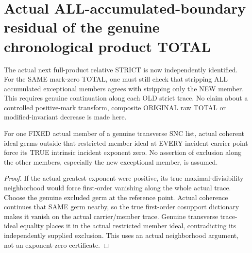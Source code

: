 \section{Actual ALL-accumulated-boundary residual of the genuine chronological product TOTAL}

The actual next full-product relative STRICT is now independently identified.
For the SAME mark-zero TOTAL, one must still check that stripping ALL
accumulated exceptional members agrees with stripping only the NEW member.
This requires genuine continuation along each OLD strict trace. No claim
about a controlled positive-mark transform, composite ORIGINAL raw TOTAL or
modified-invariant decrease is made here.

\begin{lemma}
\label{hir:sharp-actual-fixed-member-exclusion-incident-exponent-zero}
\leanok
For one FIXED actual member of a genuine transverse SNC list, actual coherent
ideal germs outside that restricted member ideal at EVERY incident carrier
point force its TRUE intrinsic incident exponent zero. No assertion of
exclusion along the other members, especially the new exceptional member,
is assumed.
\end{lemma}
\begin{proof}
If the actual greatest exponent were positive, its true maximal-divisibility
neighborhood would force first-order vanishing along the whole actual trace.
Choose the genuine excluded germ at the reference point. Actual coherence
continues that SAME germ nearby, so the true first-order cosupport dictionary
makes it vanish on the actual carrier/member trace. Genuine transverse
trace-ideal equality places it in the actual restricted member ideal,
contradicting its independently supplied exclusion. This uses an actual
neighborhood argument, not an exponent-zero certificate.
\end{proof}

